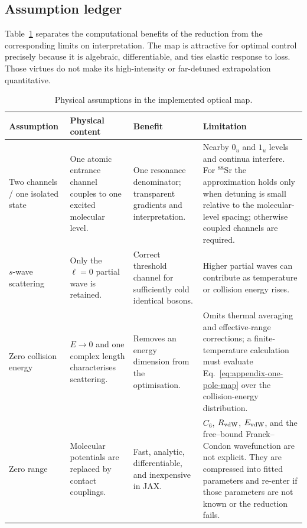 \documentclass[9pt,a4paper,twocolumn,twoside]{rho-class/rho}
\begin{document}
    \subsection{Assumption ledger}

        Table~\ref{tab:ofr-assumptions} separates the computational benefits of
        the reduction from the corresponding limits on interpretation.  The
        map is attractive for optimal control precisely because it is algebraic,
        differentiable, and ties elastic response to loss.  Those virtues do
        not make its high-intensity or far-detuned extrapolation quantitative.

        \begin{table}[!t]
            \caption{Physical assumptions in the implemented optical map.}
            \label{tab:ofr-assumptions}
            \scriptsize
            \setlength{\tabcolsep}{3.5pt}
            \renewcommand{\arraystretch}{1.18}
            \begin{tabular}{>{\raggedright\arraybackslash}p{}>{\raggedright\arraybackslash}p{}>{\raggedright\arraybackslash}p{}>{\raggedright\arraybackslash}p{}}
                \toprule
                \textbf{Assumption} & \textbf{Physical content} & \textbf{Benefit} & \textbf{Limitation} \\
                \midrule
                Two channels / one isolated state & One atomic entrance channel couples to one excited molecular level. & One resonance denominator; transparent gradients and interpretation. & Nearby $0_u$ and $1_u$ levels and continua interfere. For $^{88}\mathrm{Sr}$ the approximation holds only when detuning is small relative to the molecular-level spacing; otherwise coupled channels are required. \\
                $s$-wave scattering & Only the $\ell=0$ partial wave is retained. & Correct threshold channel for sufficiently cold identical bosons. & Higher partial waves can contribute as temperature or collision energy rises. \\
                Zero collision energy & $E\rightarrow0$ and one complex length characterises scattering. & Removes an energy dimension from the optimisation. & Omits thermal averaging and effective-range corrections; a finite-temperature calculation must evaluate Eq.~\eqref{eq:appendix-one-pole-map} over the collision-energy distribution. \\
                Zero range & Molecular potentials are replaced by contact couplings. & Fast, analytic, differentiable, and inexpensive in JAX. & $C_6$, $R_{\rm vdW}$, $E_{\rm vdW}$, and the free--bound Franck--Condon wavefunction are not explicit. They are compressed into fitted parameters and re-enter if those parameters are not known or the reduction fails. \\

\end{tabular}
\end{table}
\end{document}
